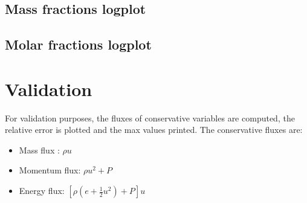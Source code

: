 \documentclass[letterpaper,10pt,english]{jupyterBook}
\begin{document}
\subsection{Mass fractions log\sphinxhyphen{}plot}
\label{\detokenize{1_Temperature/Problem_class_definition:mass-fractions-log-plot}}

\subsection{Molar fractions log\sphinxhyphen{}plot}
\label{\detokenize{1_Temperature/Problem_class_definition:molar-fractions-log-plot}}

\section{Validation}
\label{\detokenize{1_Temperature/Problem_class_definition:validation}}
\sphinxAtStartPar
For validation purposes, the fluxes of conservative variables are computed, the relative error is plotted and the max values printed. 
The conservative fluxes are:
\begin{itemize}
\item {} 
\sphinxAtStartPar
Mass flux : \( \rho u\)

\item {} 
\sphinxAtStartPar
Momentum flux: \( \rho u^2 + P \)

\item {} 
\sphinxAtStartPar
Energy flux: \( \left[ \rho \left( e + \frac{1}{2} u ^ 2 \right) + P \right] u \)

\end{itemize}
\end{document}
